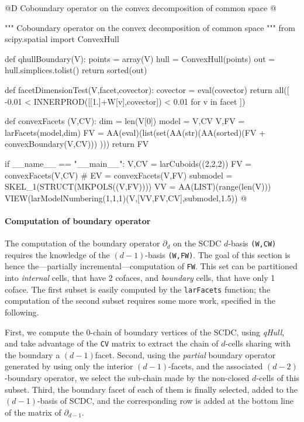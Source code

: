 \documentclass[11pt,oneside]{article}	%
\begin{document}
@D Coboundary operator on the convex decomposition of common space
@{""" Coboundary operator on the convex decomposition of common space """
from scipy.spatial import ConvexHull

def qhullBoundary(V):
	points = array(V)
	hull = ConvexHull(points)
	out = hull.simplices.tolist()
	return sorted(out)

def facetDimensionTest(V,facet,covector):
	covector = eval(covector)
	return all([ -0.01 < INNERPROD([[1.]+W[v],covector]) < 0.01 for v in facet ])

def convexFacets (V,CV):
	dim = len(V[0])
	model = V,CV
	V,FV = larFacets(model,dim)	
	FV = AA(eval)(list(set(AA(str)(AA(sorted)(FV + convexBoundary(V,CV))) )))
	return FV
	
if __name__ == "__main__":
    V,CV = larCuboids((2,2,2))
    FV = convexFacets(V,CV)
    # EV = convexFacets(V,FV)
    submodel = SKEL_1(STRUCT(MKPOLS((V,FV))))
    VV = AA(LIST)(range(len(V)))
    VIEW(larModelNumbering(1,1,1)(V,[VV,FV,CV],submodel,1.5))
@}



\paragraph{Computation of boundary operator}

The computation of the boundary operator $\partial_d$ on the SCDC $d$-basis \texttt{(W,CW)} requires the knowledge of the $(d-1)$-basis \texttt{(W,FW)}. The goal of this section is hence the---partially incremental---computation of \texttt{FW}. This set can be partitioned into \emph{internal} cells, that have 2 cofaces, and \emph{boundary} cells, that have only 1 coface. The first subset is easily computed by the \texttt{larFacets} function; the computation of the second subset requires some more work, specified in the following.

First, we compute the 0-chain of boundary vertices of the SCDC, using \emph{qHull}, and take advantage of the \texttt{CV} matrix to extract the chain of $d$-cells sharing with the boundary a $(d-1)$facet. Second, using the \emph{partial} boundary operator generated by using only the interior $(d-1)$-facets, and the associated $(d-2)$-boundary operator, we select the sub-chain made by the non-closed $d$-cells of this subset. Third, the boundary facet of each of them is finally selected, added to the $(d-1)$-basis of SCDC, and the corresponding row is added at the bottom line of the matrix of $\partial_{d-1}$.
\end{document}
